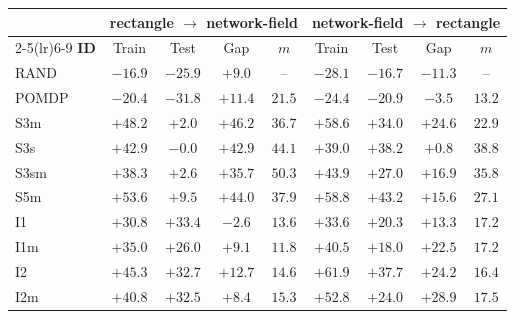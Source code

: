 \begin{tabular}{lcccc@{\hskip 1.5em}cccc}
  \toprule
  & \multicolumn{4}{c}{\textbf{rectangle $\to$ network-field}}
  & \multicolumn{4}{c}{\textbf{network-field $\to$ rectangle}} \\
  \cmidrule(lr){2-5}\cmidrule(lr){6-9}
  \textbf{ID} & Train & Test & Gap & $m$ & Train & Test & Gap & $m$ \\
  \midrule
  RAND & $-16.9$ & $-25.9$ & $+9.0$ & \multicolumn{1}{c}{--} & $-28.1$ & $-16.7$ & $-11.3$ & \multicolumn{1}{c}{--} \\
  POMDP & $-20.4$ & $-31.8$ & $+11.4$ & $21.5$ & $-24.4$ & $-20.9$ & $-3.5$ & $13.2$ \\
  \midrule
  S3m & $+48.2$ & $+2.0$ & $+46.2$ & $36.7$ & $+58.6$ & $+34.0$ & $+24.6$ & $22.9$ \\
  S3s & $+42.9$ & $-0.0$ & $+42.9$ & $44.1$ & $+39.0$ & $+38.2$ & $+0.8$ & $38.8$ \\
  S3sm & $+38.3$ & $+2.6$ & $+35.7$ & $50.3$ & $+43.9$ & $+27.0$ & $+16.9$ & $35.8$ \\
  S5m & $+53.6$ & $+9.5$ & $+44.0$ & $37.9$ & $+58.8$ & $+43.2$ & $+15.6$ & $27.1$ \\
  I1 & $+30.8$ & $+33.4$ & $-2.6$ & $13.6$ & $+33.6$ & $+20.3$ & $+13.3$ & $17.2$ \\
  I1m & $+35.0$ & $+26.0$ & $+9.1$ & $11.8$ & $+40.5$ & $+18.0$ & $+22.5$ & $17.2$ \\
  I2 & $+45.3$ & $+32.7$ & $+12.7$ & $14.6$ & $+61.9$ & $+37.7$ & $+24.2$ & $16.4$ \\
  I2m & $+40.8$ & $+32.5$ & $+8.4$ & $15.3$ & $+52.8$ & $+24.0$ & $+28.9$ & $17.5$ \\
  \bottomrule
\end{tabular}
